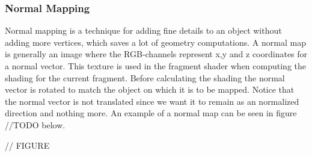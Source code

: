 \subsubsection{Normal Mapping}
Normal mapping is a technique for adding fine details to an object without adding more vertices, which saves a lot of geometry computations. A normal map is generally an image where the RGB-channels represent x,y and z coordinates for a normal vector. This texture is used in the fragment shader when computing the shading for the current fragment. Before calculating the shading the normal vector is rotated to match the object on which it is to be mapped. Notice that the normal vector is not translated since we want it to remain as an normalized direction and nothing more. An example of a normal map can be seen in figure //TODO below.

// FIGURE
